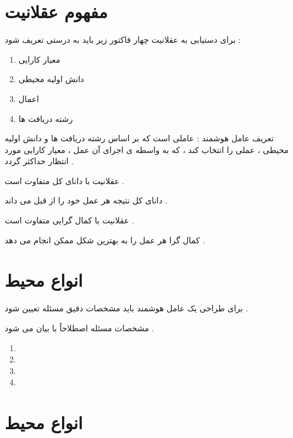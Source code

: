 \documentclass[12pt]{article}
\begin{document}
\section{مفهوم عقلانیت}


\noindent
برای دستیابی به عقلانیت چهار فاکتور زیر باید به درستی تعریف شود :

\begin{enumerate}
	\item معیار کارایی
	\item دانش اولیه محیطی
	\item اعمال
	\item رشته دریافت ها
\end{enumerate}


\noindent
تعریف عامل هوشمند : عاملی است که بر اساس رشته دریافت ها و دانش اولیه محیطی ، عملی را انتخاب کند ، که به واسطه ی اجرای آن عمل ، معیار کارایی مورد انتظار حداکثر گردد .


\vspace{30pt}

\noindent
عقلانیت با دانای کل
متفاوت است .


\noindent
دانای کل نتیجه هر عمل خود را از قبل می داند .




\vspace{30pt}

\noindent
عقلانیت با کمال گرایی 
متفاوت است .

\noindent
کمال گرا هر عمل را به بهترین شکل ممکن انجام می دهد .




\section{انواع محیط}

برای طراحی یک عامل هوشمند باید مشخصات دقیق مسئله تعیین شود .

\noindent
مشخصات مسئله اصطلاحاً با 
بیان می شود .


\begin{enumerate}
	\item {}
	\item {}
	\item {}
	\item {}
\end{enumerate}




\section{انواع محیط}
\end{document}
